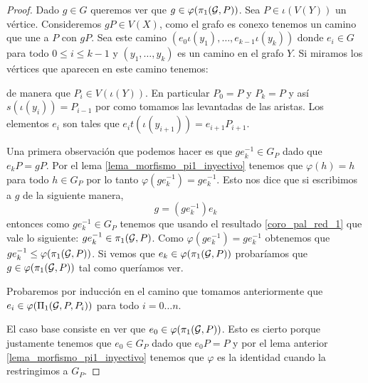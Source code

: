 \documentclass[tesis.tex]{subfiles}
\begin{document}
\begin{proof}
	Dado $g \in G$ queremos ver que $g \in \varphi(\pi_1({\cal G}, P))$.
	Sea $P \in \iota(V(Y))$ un vértice.
	Consideremos $gP \in V(X)$, como el grafo es conexo tenemos un camino que une a $P$ con $gP$. 
	Sea este camino $(e_{0}\iota(y_{1}), \dots, e_{k-1}\iota(y_{k}))$ donde $e_{i} \in G$ para todo $0 \le i \le k-1$ y $(y_{1}, \dots, y_{k})$ es un camino en el grafo $Y$.
	Si miramos los vértices que aparecen en este camino tenemos:	
	\begin{center}
	\end{center}


	de manera que $P_i \in V(\iota (Y))$.
	En particular $P_0 = P$ y  $P_k = P$ y así $s(\iota (y_i)) = P_{i-1}$ por como tomamos las levantadas de las aristas.
	Los elementos $e_i$ son tales que $e_i t(\iota (y_{i+1})) = e_{i+1}P_{i+1}$.	
	
	
	Una primera observación que podemos hacer es que $g e_k^{-1} \in G_P$ dado que  $e_k P = g P$.
	Por el lema \ref{lema_morfismo_pi1_inyectivo} tenemos que $\varphi(h) = h $ para todo $h \in G_P$ por lo tanto $\varphi(ge_{k}^{-1}) = ge_{k}^{-1}$.
	Esto nos dice que si escribimos a $g$ de la siguiente manera,
	\[
	g = (ge_k^{-1}) e_k
	\]
	entonces como $ge_k^{-1} \in G_P$ tenemos que usando el resultado \ref{coro_pal_red_1} que vale lo siguiente: $ge_k^{-1} \in \pi_1({\cal G},P)$.
	Como $ \varphi(ge_{k}^{-1}) = ge_{k}^{-1}$ obtenemos que  $ge_{k}^{-1} \le \varphi(\pi_1({\cal G}, P))$.  
	Si vemos que $e_k \in \varphi(\pi_1({\cal G}, P))$ probaríamos que $g \in \varphi (\pi_1({\cal G},P))$ tal como queríamos ver.
		
	Probaremos por inducción en el camino que tomamos anteriormente que $e_i \in \varphi(\Pi_1({\cal G}, P, P_i))$ para todo $i = 0 \dots n$.
	
	El caso base consiste en ver que $e_0 \in \varphi(\pi_1({\cal G}, P))$.
	Esto es cierto porque justamente tenemos que $e_0 \in G_P$ dado que $e_{0}P = P$ y por el lema anterior \ref{lema_morfismo_pi1_inyectivo} tenemos que $\varphi$ es la identidad cuando la restringimos a $G_P$.
	

\end{proof}
\end{document}
